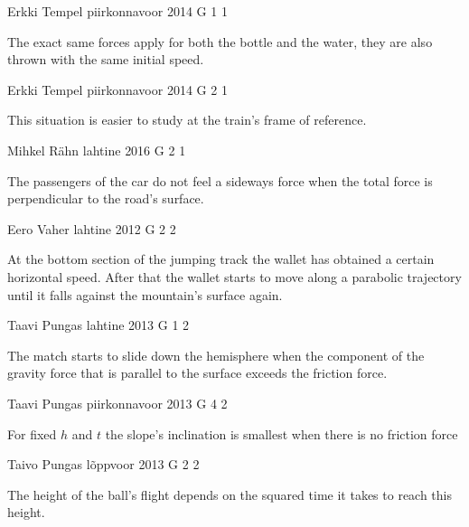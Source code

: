 \documentclass[11pt]{article}
\begin{document}
{Erkki Tempel} %
{piirkonnavoor} %
{2014} %
{G 1} %
{1} %
{

\ifEngHint
The exact same forces apply for both the bottle and the water, they are also thrown with the same initial speed.
\fi
}

{Erkki Tempel} %
{piirkonnavoor} %
{2014} %
{G 2} %
{1} %
{

\ifEngHint
This situation is easier to study at the train’s frame of reference.
\fi
}

{Mihkel Rähn} %
{lahtine} %
{2016} %
{G 2} %
{1} %
{

\ifEngHint
The passengers of the car do not feel a sideways force when the total force is perpendicular to the road’s surface.
\fi
}

{Eero Vaher} %
{lahtine} %
{2012} %
{G 2} %
{2} %
{

\ifEngHint
At the bottom section of the jumping track the wallet has obtained a certain horizontal speed. After that the wallet starts to move along a parabolic trajectory until it falls against the mountain’s surface again.
\fi
}

{Taavi Pungas} %
{lahtine} %
{2013} %
{G 1} %
{2} %
{

\ifEngHint
The match starts to slide down the hemisphere when the component of the gravity force that is parallel to the surface exceeds the friction force.
\fi
}

{Taavi Pungas} %
{piirkonnavoor} %
{2013} %
{G 4} %
{2} %
{

\ifEngHint
For fixed $h$ and $t$ the slope’s inclination is smallest when there is no friction force
\fi
}

{Taivo Pungas} %
{lõppvoor} %
{2013} %
{G 2} %
{2} %
{

\ifEngHint
The height of the ball’s flight depends on the squared time it takes to reach this height.
\fi
}
\end{document}
